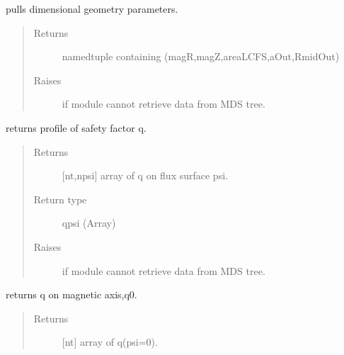 \documentclass[letterpaper,10pt,english]{sphinxmanual}
\begin{document}
\begin{fulllineitems}
\begin{fulllineitems}
\label{\detokenize{eqtools:eqtools.EFIT.EFITTree.getGeometry}}
pulls dimensional geometry parameters.
\begin{quote}\begin{description}
\item[{Returns}] \leavevmode
namedtuple containing (magR,magZ,areaLCFS,aOut,RmidOut)

\item[{Raises}] \leavevmode
{} \textendash{} if module cannot retrieve data from MDS tree.

\end{description}\end{quote}

\end{fulllineitems}


\begin{fulllineitems}
\label{\detokenize{eqtools:eqtools.EFIT.EFITTree.getQProfile}}
returns profile of safety factor q.
\begin{quote}\begin{description}
\item[{Returns}] \leavevmode
{[}nt,npsi{]} array of q on flux surface psi.

\item[{Return type}] \leavevmode
qpsi (Array)

\item[{Raises}] \leavevmode
{} \textendash{} if module cannot retrieve data from MDS tree.

\end{description}\end{quote}

\end{fulllineitems}


\begin{fulllineitems}
\label{\detokenize{eqtools:eqtools.EFIT.EFITTree.getQ0}}
returns q on magnetic axis,q0.
\begin{quote}\begin{description}
\item[{Returns}] \leavevmode
{[}nt{]} array of q(psi=0).


\end{description}
\end{quote}
\end{fulllineitems}
\end{fulllineitems}
\end{document}
